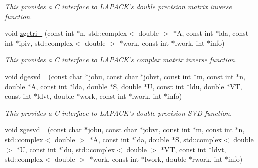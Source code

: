 \begin{DoxyCompactItemize}
\begin{DoxyCompactList}\small\item\em This provides a C interface to L\-A\-P\-A\-C\-K's double precision matrix inverse function. \end{DoxyCompactList}\item 
\hypertarget{namespacekeycpp_a4190e125fe33133aafa586089ca6e174}{void \hyperlink{namespacekeycpp_a4190e125fe33133aafa586089ca6e174}{zgetri\-\_\-} (const int $\ast$n, std\-::complex$<$ double $>$ $\ast$A, const int $\ast$lda, const int $\ast$ipiv, std\-::complex$<$ double $>$ $\ast$work, const int $\ast$lwork, int $\ast$info)}\label{namespacekeycpp_a4190e125fe33133aafa586089ca6e174}

\begin{DoxyCompactList}\small\item\em This provides a C interface to L\-A\-P\-A\-C\-K's complex matrix inverse function. \end{DoxyCompactList}\item 
\hypertarget{namespacekeycpp_a8fe7a71afbb6c5dc049cdd7afff6c0af}{void \hyperlink{namespacekeycpp_a8fe7a71afbb6c5dc049cdd7afff6c0af}{dgesvd\-\_\-} (const char $\ast$jobu, const char $\ast$jobvt, const int $\ast$m, const int $\ast$n, double $\ast$A, const int $\ast$lda, double $\ast$S, double $\ast$U, const int $\ast$ldu, double $\ast$V\-T, const int $\ast$ldvt, double $\ast$work, const int $\ast$lwork, int $\ast$info)}\label{namespacekeycpp_a8fe7a71afbb6c5dc049cdd7afff6c0af}

\begin{DoxyCompactList}\small\item\em This provides a C interface to L\-A\-P\-A\-C\-K's double precision S\-V\-D function. \end{DoxyCompactList}\item 
\hypertarget{namespacekeycpp_afa5e2f74110f53bd288c15ce1f183f9b}{void \hyperlink{namespacekeycpp_afa5e2f74110f53bd288c15ce1f183f9b}{zgesvd\-\_\-} (const char $\ast$jobu, const char $\ast$jobvt, const int $\ast$m, const int $\ast$n, std\-::complex$<$ double $>$ $\ast$A, const int $\ast$lda, double $\ast$S, std\-::complex$<$ double $>$ $\ast$U, const int $\ast$ldu, std\-::complex$<$ double $>$ $\ast$V\-T, const int $\ast$ldvt, std\-::complex$<$ double $>$ $\ast$work, const int $\ast$lwork, double $\ast$rwork, int $\ast$info)}\label{namespacekeycpp_afa5e2f74110f53bd288c15ce1f183f9b}


\end{DoxyCompactItemize}
